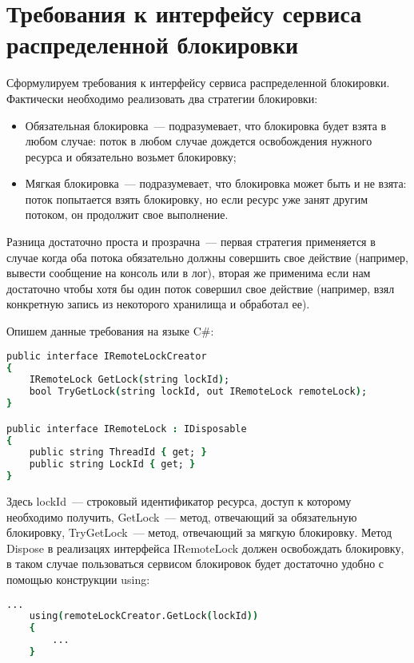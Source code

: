 \section{Требования к интерфейсу сервиса распределенной блокировки}

Сформулируем требования к интерфейсу сервиса распределенной блокировки. Фактически необходимо реализовать два стратегии блокировки:

\begin{itemize} 
	\item Обязательная блокировка~--- подразумевает, что блокировка будет взята в любом случае: поток в любом случае дождется освобождения нужного ресурса и обязательно возьмет блокировку;
	\item Мягкая блокировка~--- подразумевает, что блокировка может быть и не взята: поток попытается взять блокировку, но если ресурс уже занят другим потоком, он продолжит свое выполнение.
\end{itemize}

Разница достаточно проста и прозрачна~--- первая стратегия применяется в случае когда оба потока обязательно должны совершить свое действие (например, вывести сообщение на консоль или в лог), вторая же применима если нам достаточно чтобы хотя бы один поток совершил свое действие (например, взял конкретную запись из некоторого хранилища и обработал ее). 

Опишем данные требования на языке C\#:

\begin{lstlisting}[language=csh,caption={Описание интерфейса}]
public interface IRemoteLockCreator
{
	IRemoteLock GetLock(string lockId);
	bool TryGetLock(string lockId, out IRemoteLock remoteLock);
}

public interface IRemoteLock : IDisposable
{
	public string ThreadId { get; }
	public string LockId { get; }
}
\end{lstlisting}

Здесь lockId~--- строковый идентификатор ресурса, доступ к которому необходимо получить, GetLock~--- метод, отвечающий за обязательную блокировку, TryGetLock~--- метод, отвечающий за мягкую блокировку. Метод Dispose в реализацях интерфейса IRemoteLock должен освобождать блокировку, в таком случае пользоваться сервисом блокировок будет достаточно удобно с помощью конструкции using:

\begin{lstlisting}[language=csh,caption={Использование конструкции using}]
	...
	using(remoteLockCreator.GetLock(lockId))
	{
		...
	}
\end{lstlisting}